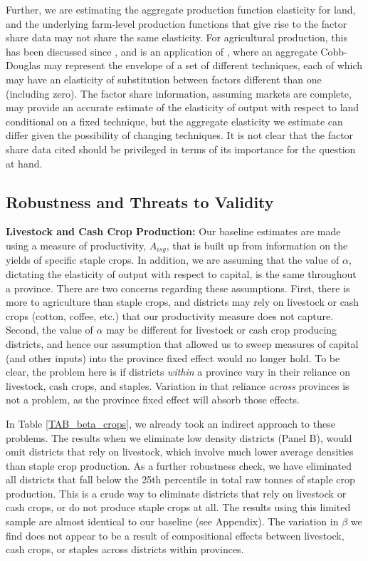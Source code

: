 \documentclass[11pt]{article}
\begin{document}
Further, we are estimating the aggregate production function elasticity for land, and the underlying farm-level production functions that give rise to the factor share data may not share the same elasticity. For agricultural production, this has been discussed since \citet{Hayami:1970ly}, and is an application of \citet{houthakker1955}, where an aggregate Cobb-Douglas may represent the envelope of a set of different techniques, each of which may have an elasticity of substitution between factors different than one (including zero). The factor share information, assuming markets are complete, may provide an accurate estimate of the elasticity of output with respect to land conditional on a fixed technique, but the aggregate elasticity we estimate can differ given the possibility of changing techniques. It is not clear that the factor share data cited should be privileged in terms of its importance for the question at hand.

\subsection{Robustness and Threats to Validity}
\textbf{Livestock and Cash Crop Production:} Our baseline estimates are made using a measure of productivity, $A_{isg}$, that is built up from information on the yields of specific staple crops. In addition, we are assuming that the value of $\alpha$, dictating the elasticity of output with respect to capital, is the same throughout a province. There are two concerns regarding these assumptions. First, there is more to agriculture than staple crops, and districts may rely on livestock or cash crops (cotton, coffee, etc.) that our productivity measure does not capture. Second, the value of $\alpha$ may be different for livestock or cash crop producing districts, and hence our assumption that allowed us to sweep measures of capital (and other inputs) into the province fixed effect would no longer hold. To be clear, the problem here is if districts \textit{within} a province vary in their reliance on livestock, cash crops, and staples. Variation in that reliance \textit{across} provinces is not a problem, as the province fixed effect will absorb those effects.

In Table \ref{TAB_beta_crops}, we already took an indirect approach to these problems. The results when we eliminate low density districts (Panel B), would omit districts that rely on livestock, which involve much lower average densities than staple crop production. As a further robustness check, we have eliminated all districts that fall below the 25th percentile in total raw tonnes of staple crop production. This is a crude way to eliminate districts that rely on livestock or cash crops, or do not produce staple crops at all. The results using this limited sample are almost identical to our baseline (see Appendix). The variation in $\beta$ we find does not appear to be a result of compositional effects between livestock, cash crops, or staples across districts within provinces.
\end{document}

